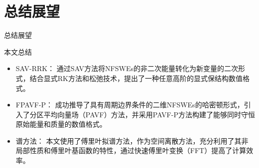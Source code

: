 \documentclass[aspectratio=169]{beamer}
\begin{document}
\section{总结展望}
\begin{frame}{总结展望}
	\begin{block}{本文总结}
			\begin{itemize}
				\item \textcolor[rgb]{0.227,0.373,0.306}{SAV-RRK：} 通过SAV方法将NFSWEs的非二次能量转化为新变量的二次形式，结合显式RK方法和松弛技术，提出了一种任意高阶的显式保结构数值格式。
				\item \textcolor[rgb]{0.227,0.373,0.306}{FPAVF-P：} 成功推导了具有周期边界条件的二维NFSWEs的哈密顿形式，引入了分区平均向量场（PAVF）方法，并采用PAVF-P方法构建了能够同时守恒原始能量和质量的数值格式。
				\item \textcolor[rgb]{0.227,0.373,0.306}{谱方法：} 本文使用了傅里叶拟谱方法，作为空间离散方法，充分利用了其非局部性质和傅里叶基函数的特性，通过快速傅里叶变换（FFT）提高了计算效率。
			\end{itemize}
		\end{block}
		
\end{frame}
\end{document}
